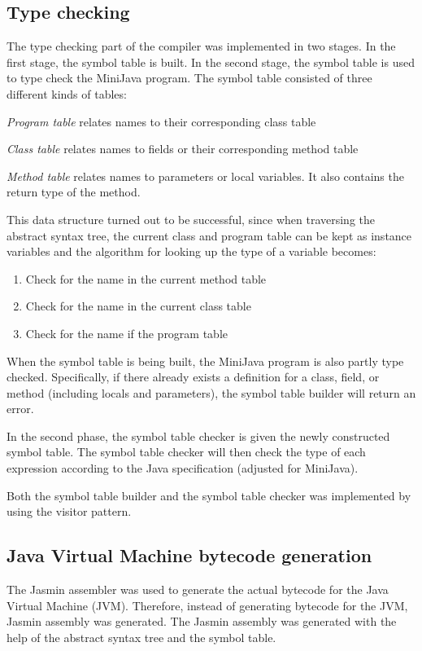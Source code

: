 \documentclass[11pt,oneside,a4paper]{article}
\begin{document}
\subsection{Type checking}
The type checking part of the compiler was implemented in two stages. In the
first stage, the symbol table is built. In the second stage, the symbol table
is used to type check the MiniJava program. The symbol table consisted of three
different kinds of tables:
\begin{description}
\item{\emph{Program table}} relates names to their corresponding class table
\item{\emph{Class table}} relates names to fields or their corresponding method
table
\item{\emph{Method table}} relates names to parameters or local variables. It 
also contains the return type of the method.
\end{description}
This data structure turned out to be successful, since when traversing the
abstract syntax tree, the current class and program table can be kept as
instance variables and the algorithm for looking up the type of a variable
becomes:
\begin{enumerate}
\item Check for the name in the current method table
\item Check for the name in the current class table
\item Check for the name if the program table
\end{enumerate}

When the symbol table is being built, the MiniJava program is also partly type
checked. Specifically, if there already exists a definition for a class, field,
or method (including locals and parameters), the symbol table builder will 
return an error. 

In the second phase, the symbol table checker is given the newly constructed 
symbol table. The symbol table checker will then check the type of each
expression according to the Java specification (adjusted for MiniJava). 

Both the symbol table builder and the symbol table checker was implemented by
using the visitor pattern.

\subsection{Java Virtual Machine bytecode generation}
The Jasmin assembler was used to generate the actual bytecode for the Java
Virtual Machine (JVM). Therefore, instead of generating bytecode for the JVM,
Jasmin assembly was generated. The Jasmin assembly was generated with the help
of the abstract syntax tree and the symbol table. 
\end{document}
